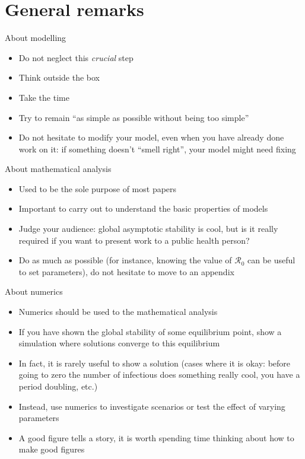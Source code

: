 \documentclass[aspectratio=169]{beamer}\usepackage[]{graphicx}\usepackage[]{xcolor}
\begin{document}
\section{General remarks}    


\begin{frame}{About modelling}
	\begin{itemize}
		\item Do not neglect this \emph{crucial} step
		\vfill
		\item Think outside the box
		\vfill
		\item Take the time
		\vfill
		\item Try to remain ``as simple as possible without being too simple''
		\vfill
		\item Do not hesitate to modify your model, even when you have already done work on it: if something doesn't ``smell right'', your model might need fixing
	\end{itemize}
\vfill
\end{frame} 

\begin{frame}{About mathematical analysis}
	\begin{itemize}
		\item Used to be the sole purpose of most papers
		\vfill
		\item Important to carry out to understand the basic properties of models
		\vfill
		\item Judge your audience: global asymptotic stability is cool, but is it really required if you want to present work to a public health person?
		\vfill
		\item Do as much as possible (for instance, knowing the value of $\mathcal{R}_0$ can be useful to set parameters), do not hesitate to move to an appendix 
	\end{itemize}
\end{frame} 

\begin{frame}{About numerics}
	\begin{itemize}
		\item Numerics should be used to  the mathematical analysis
		\vfill
		\item If you have shown the global stability of some equilibrium point,  show a simulation where solutions converge to this equilibrium
		\vfill
		\item In fact, it is rarely useful to show a solution (cases where it is okay: before going to zero the number of infectious does something really cool, you have a period doubling, etc.)
		\vfill
		\item Instead, use numerics to investigate scenarios or test the effect of varying parameters
		\vfill
		\item A good figure tells a story, it is worth spending time thinking about how to make good figures
	\end{itemize}
\end{frame} 
\end{document}
